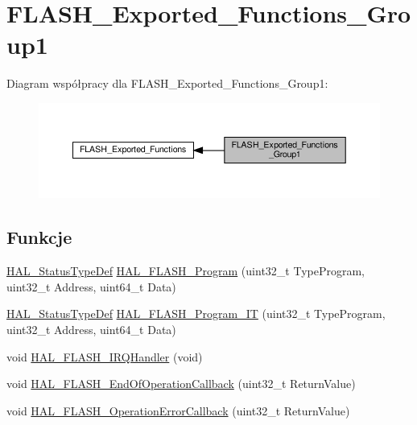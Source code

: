 \hypertarget{group___f_l_a_s_h___exported___functions___group1}{}\section{F\+L\+A\+S\+H\+\_\+\+Exported\+\_\+\+Functions\+\_\+\+Group1}
\label{group___f_l_a_s_h___exported___functions___group1}
Diagram współpracy dla F\+L\+A\+S\+H\+\_\+\+Exported\+\_\+\+Functions\+\_\+\+Group1\+:\nopagebreak
\begin{figure}[H]
\begin{center}
\leavevmode
\includegraphics[width=350pt]{group___f_l_a_s_h___exported___functions___group1}
\end{center}
\end{figure}
\subsection*{Funkcje}
\begin{DoxyCompactItemize}
\item 
\hyperlink{stm32f4xx__hal__def_8h_a63c0679d1cb8b8c684fbb0632743478f}{H\+A\+L\+\_\+\+Status\+Type\+Def} \hyperlink{group___f_l_a_s_h___exported___functions___group1_gab94b3dc16c5c6fcc30ba2cb897de8bae}{H\+A\+L\+\_\+\+F\+L\+A\+S\+H\+\_\+\+Program} (uint32\+\_\+t Type\+Program, uint32\+\_\+t Address, uint64\+\_\+t Data)
\item 
\hyperlink{stm32f4xx__hal__def_8h_a63c0679d1cb8b8c684fbb0632743478f}{H\+A\+L\+\_\+\+Status\+Type\+Def} \hyperlink{group___f_l_a_s_h___exported___functions___group1_ga85ee0375f81ac12bf0acd013189f68d3}{H\+A\+L\+\_\+\+F\+L\+A\+S\+H\+\_\+\+Program\+\_\+\+IT} (uint32\+\_\+t Type\+Program, uint32\+\_\+t Address, uint64\+\_\+t Data)
\item 
void \hyperlink{group___f_l_a_s_h___exported___functions___group1_ga083f13f6a000dfcb80c7a27853eba528}{H\+A\+L\+\_\+\+F\+L\+A\+S\+H\+\_\+\+I\+R\+Q\+Handler} (void)
\item 
void \hyperlink{group___f_l_a_s_h___exported___functions___group1_ga71a7e85ede66fae4eadaf8854f81b5c8}{H\+A\+L\+\_\+\+F\+L\+A\+S\+H\+\_\+\+End\+Of\+Operation\+Callback} (uint32\+\_\+t Return\+Value)
\item 
void \hyperlink{group___f_l_a_s_h___exported___functions___group1_ga237e17bd9b1d257bd8e2880227b8484e}{H\+A\+L\+\_\+\+F\+L\+A\+S\+H\+\_\+\+Operation\+Error\+Callback} (uint32\+\_\+t Return\+Value)
\end{DoxyCompactItemize}


